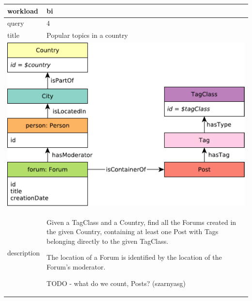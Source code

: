 \renewcommand*{\arraystretch}{1.1}

\noindent\begin{tabularx}{17cm}{|p{1.95cm}|X|}
	\hline
	workload    & bi \\ \hline
%
	query       & 4 \\ \hline
%
	title       & Popular topics in a country \\ \hline
	\multicolumn{2}{|c|}{ \includegraphics[scale=\patternscale,margin=0cm .2cm]{patterns/bi04}} \\ \hline
	description & Given a TagClass and a Country, find all the Forums created in the given
Country, containing at least one Post with Tags belonging directly to
the given TagClass.

The location of a Forum is identified by the location of the Forum's
moderator.

TODO - what do we count, Posts? (szarnyasg)
 \\ \hline
	

\end{tabularx}
